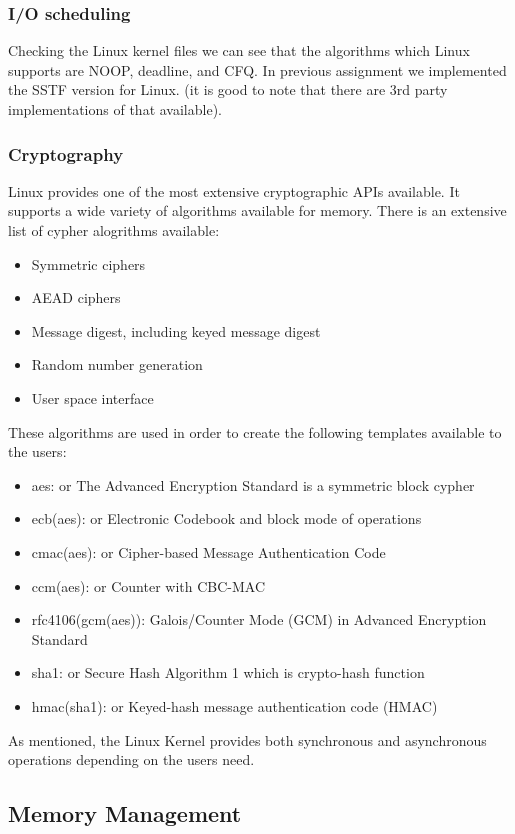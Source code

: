 \documentclass[journal,10pt,onecolumn,compsoc,letterpaper,draftclsnofoot,table,xcdraw]{IEEEtran} \usepackage[margin=0.75in]{geometry}
\begin{document}
\subsubsection{I/O scheduling}
\noindent Checking the Linux kernel files we can see that the algorithms which Linux supports are NOOP, deadline, and CFQ. In previous assignment we implemented the SSTF version for Linux. (it is good to note that there are 3rd party implementations of that available).
\subsubsection{Cryptography}
\noindent Linux provides one of the most extensive cryptographic APIs available. It supports a wide variety of algorithms available for memory. There is an extensive list of cypher alogrithms available: \cite{5}
\begin{itemize}
\item Symmetric ciphers
\item AEAD ciphers
\item Message digest, including keyed message digest
\item Random number generation
\item User space interface
\end{itemize}
\noindent These algorithms are used in order to create the following templates available to the users: \cite{6}
\begin{itemize}
\item aes: or The Advanced Encryption Standard is a symmetric block cypher
\item ecb(aes): or Electronic Codebook and block mode of operations
\item cmac(aes): or Cipher-based Message Authentication Code
\item ccm(aes): or  Counter with CBC-MAC
\item rfc4106(gcm(aes)): Galois/Counter Mode (GCM) in Advanced Encryption Standard
\item sha1: or Secure Hash Algorithm 1 which is crypto-hash function
\item hmac(sha1): or Keyed-hash message authentication code (HMAC) 
\end{itemize}
\noindent As mentioned, the Linux Kernel provides both synchronous and asynchronous operations depending on the users need.

\subsection{Memory Management}
\end{document}
